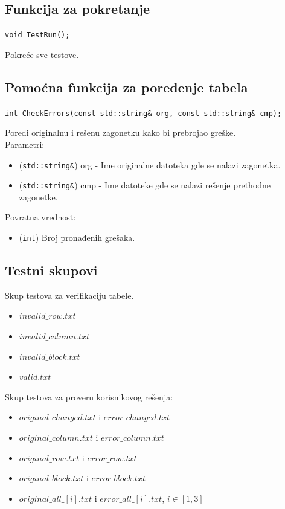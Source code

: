 \documentclass[a4paper]{article}
\begin{document}
    \subsection{Funkcija za pokretanje}
    \texttt{void TestRun();}
    \par Pokreće sve testove.
    \subsection{Pomoćna funkcija za poređenje tabela}
    {\parindent0pt
    \texttt{int CheckErrors(const std::string\& org, const std::string\& cmp);}
    }
    \par Poredi originalnu i rešenu zagonetku kako bi prebrojao greške.\\
    Parametri:
    \begin{itemize}
        \item (\texttt{std::string\&}) org - Ime originalne datoteka gde se nalazi zagonetka.
        \item (\texttt{std::string\&}) cmp - Ime datoteke gde se nalazi rešenje prethodne zagonetke.
    \end{itemize}
    Povratna vrednost:
    \begin{itemize}
        \item (\texttt{int}) Broj pronađenih grešaka.
    \end{itemize}
    \subsection{Testni skupovi}
    {\parindent0pt
        Skup testova za verifikaciju tabele.
        \begin{itemize}
            \item $invalid\_row.txt$
            \item $invalid\_column.txt$
            \item $invalid\_block.txt$
            \item $valid.txt$
        \end{itemize}
        \par Skup testova za proveru korisnikovog rešenja:
        \begin{itemize}
            \item $original\_changed.txt$ i $error\_changed.txt$
            \item $original\_column.txt$ i $error\_column.txt$
            \item $original\_row.txt$ i $error\_row.txt$
            \item $original\_block.txt$ i $error\_block.txt$
            \item $original\_all\_[i].txt$ i $error\_all\_[i].txt$, $i\in[1,3]$
        \end{itemize}    
    }
\end{document}
